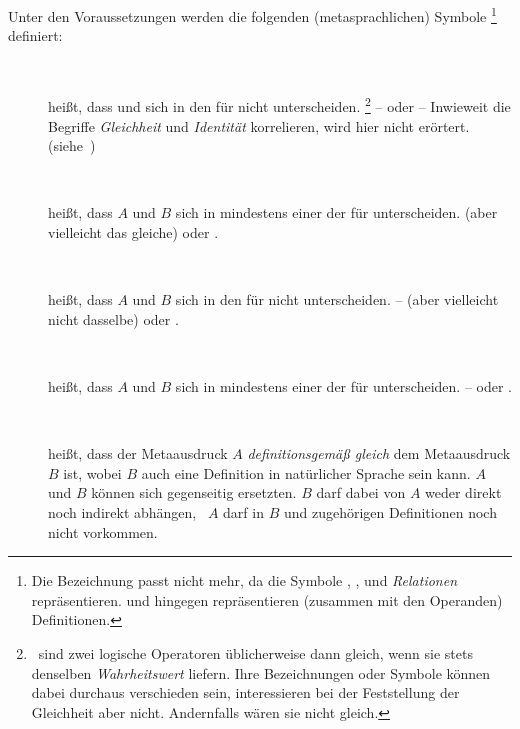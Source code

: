 Unter den Voraussetzungen  werden die folgenden (metasprachlichen) Symbole%
\footnote{%
	Die Bezeichnung  passt nicht mehr, da die Symbole \symqt{\eq}, \symqt{\neq}, \symqt{\equiv} und \symqt{\nequiv} \emph{Relationen} repräsentieren. \symqt{\metadefeq} und  hingegen repräsentieren (zusammen mit den Operanden) Definitionen.
}
definiert:
\begin{description}
	\item[~~\emph{}]\label{def:Gleichheit}
	 heißt, dass  und  sich in den  für \opqt{=} nicht unterscheiden.%
	\footnote{%
		\textZB\ sind zwei logische Operatoren üblicherweise dann gleich, wenn sie stets denselben \emph{\gls{Wahrheitswert}} liefern.
		Ihre Bezeichnungen oder Symbole können dabei durchaus verschieden sein, interessieren bei der Feststellung der Gleichheit aber nicht.
		Andernfalls wären sie nicht gleich.
	}
	--  oder 
	-- Inwieweit die Begriffe \emph{Gleichheit} und \emph{Identität} korrelieren, wird hier nicht erörtert. (siehe~\cite{bib:Identitaet})
	\item[~~\emph{}]\label{def:Ungleichheit}
	 heißt, dass $A$ und $B$ sich in mindestens einer der  für \opqt{=} unterscheiden.  (aber vielleicht das gleiche) oder .
	\item[~~\emph{}]\label{def:Äquivalenz}
	 heißt, dass $A$ und $B$ sich in den  für \symqt{\equiv} nicht unterscheiden.
	--  (aber vielleicht nicht dasselbe) oder .
	\item[~~\emph{}]\label{def:Kontravalenz}
	 heißt, dass $A$ und $B$ sich in mindestens einer der  für \opqt{\nequiv} unterscheiden.
	--  oder .
	\item[~\emph{}]\label{def:Metadefinition}
	 heißt, dass der Metaausdruck $A$ \emph{definitionsgemäß gleich} dem Metaausdruck $B$ ist, wobei $B$ auch eine Definition in natürlicher Sprache sein kann.
	$A$ und $B$ können sich gegenseitig ersetzten.
	$B$ darf dabei von $A$ weder direkt noch indirekt abhängen, \textdh\ $A$ darf in $B$ und zugehörigen Definitionen noch nicht vorkommen.


\end{description}
